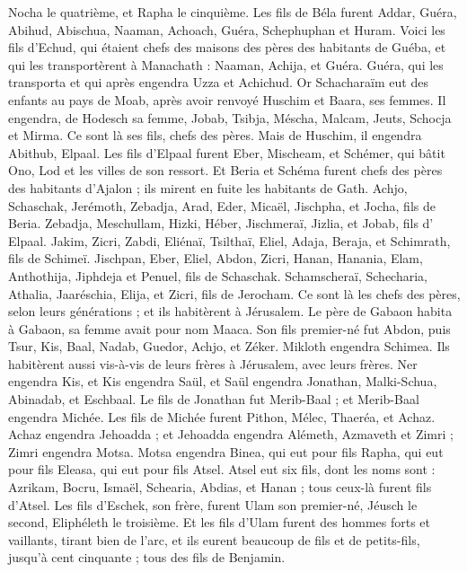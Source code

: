 \begin{multicols}{2}
Nocha le quatrième, et Rapha le cinquième.
Les fils de Béla furent Addar, Guéra, Abihud,
Abischua, Naaman, Achoach,
Guéra, Schephuphan et Huram.
Voici les fils d'Echud, qui étaient chefs des maisons des pères des habitants de Guéba, et qui les transportèrent à Manachath :
Naaman, Achija, et Guéra. Guéra, qui les transporta et qui après engendra Uzza et Achichud.
Or Schacharaïm eut des enfants au pays de Moab, après avoir renvoyé Huschim et Baara, ses femmes.
Il engendra, de Hodesch sa femme, Jobab, Tsibja, Méscha, Malcam,
Jeuts, Schocja et Mirma. Ce sont là ses fils, chefs des pères.
Mais de Huschim, il engendra Abithub, Elpaal.
Les fils d'Elpaal furent Eber, Mischeam, et Schémer, qui bâtit Ono, Lod et les villes de son ressort.
Et Beria et Schéma furent chefs des pères des habitants d'Ajalon ; ils mirent en fuite les habitants de Gath.
Achjo, Schaschak, Jerémoth,
Zebadja, Arad, Eder,
Micaël, Jischpha, et Jocha, fils de Beria.
Zebadja, Meschullam, Hizki, Héber,
Jischmeraï, Jizlia, et Jobab, fils d' Elpaal.
Jakim, Zicri, Zabdi,
Eliénaï, Tsilthaï, Eliel,
Adaja, Beraja, et Schimrath, fils de Schimeï.
Jischpan, Eber, Eliel,
Abdon, Zicri, Hanan,
Hanania, Elam, Anthothija,
Jiphdeja et Penuel, fils de Schaschak.
Schamscheraï, Schecharia, Athalia,
Jaaréschia, Elija, et Zicri, fils de Jerocham.
Ce sont là les chefs des pères, selon leurs générations ; et ils habitèrent à Jérusalem.
Le père de Gabaon habita à Gabaon, sa femme avait pour nom Maaca.
Son fils premier-né fut Abdon, puis Tsur, Kis, Baal, Nadab,
Guedor, Achjo, et Zéker.
Mikloth engendra Schimea. Ils habitèrent aussi vis-à-vis de leurs frères à Jérusalem, avec leurs frères.
Ner engendra Kis, et Kis engendra Saül, et Saül engendra Jonathan, Malki-Schua, Abinadab, et Eschbaal.
Le fils de Jonathan fut  Merib-Baal ; et Merib-Baal engendra Michée.
Les fils de Michée furent Pithon, Mélec, Thaeréa, et Achaz.
Achaz engendra Jehoadda ; et Jehoadda engendra Alémeth, Azmaveth et Zimri ; Zimri engendra Motsa.
Motsa engendra Binea, qui eut pour fils Rapha, qui eut pour fils Eleasa, qui eut pour fils Atsel.
Atsel eut six fils, dont les noms sont : Azrikam, Bocru, Ismaël, Schearia, Abdias, et Hanan ; tous ceux-là furent fils d'Atsel.
Les fils d'Eschek, son frère, furent  Ulam son premier-né, Jéusch le second, Eliphéleth le troisième.
Et les fils d'Ulam furent des hommes forts et vaillants, tirant bien de l'arc, et ils eurent beaucoup de fils et de petits-fils, jusqu'à cent cinquante ; tous des fils de Benjamin.

\end{multicols}
